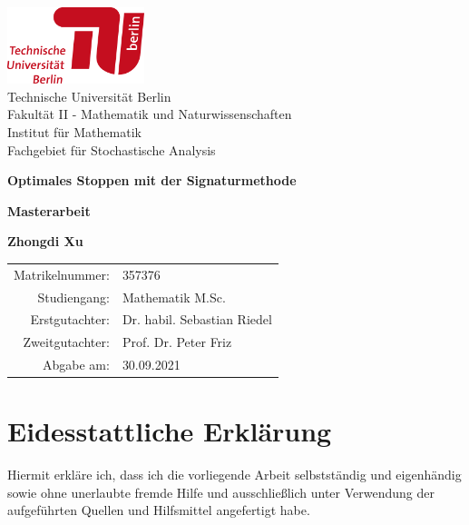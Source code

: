 \documentclass[12pt,titlepage,headsepline]{article}
\begin{document}
    \begin{titlepage}
      \begin{center}
        \includegraphics[width=0.3\textwidth]{TU.png}\\
        Technische Universität Berlin \\
        Fakultät II - Mathematik und Naturwissenschaften\\
        Institut für Mathematik \\
        Fachgebiet für Stochastische Analysis

        \vspace{1.5cm}
        \LARGE
        \textbf{Optimales Stoppen mit der Signaturmethode}

        \vspace{1.5cm}
        \Huge
        \textbf{Masterarbeit}

        \vspace{1cm}
        \small

        \large
        \textbf{Zhongdi Xu}

        \vspace{4cm}

        \small{\scshape
        \begin{tabular}{rl}
         Matrikelnummer: & 357376 \\
         Studiengang: & Mathematik M.Sc.\\
         Erstgutachter: & Dr. habil. Sebastian Riedel\\
         Zweitgutachter: & Prof. Dr. Peter Friz \\
         Abgabe am: & 30.09.2021\\
         \end{tabular}
        }

      \end{center}
    \end{titlepage}
    \newpage
    \tableofcontents
    \newpage

    \section*{Eidesstattliche Erklärung}
    \thispagestyle{empty}
    Hiermit erkläre ich, dass ich die vorliegende Arbeit selbstständig und eigenhändig sowie ohne unerlaubte fremde Hilfe und ausschließlich unter Verwendung der aufgeführten Quellen und Hilfsmittel angefertigt habe.
\end{document}
